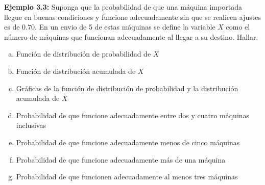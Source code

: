 \documentclass[base=hide,12pt]{elegantbook}
\begin{document}
\vspace{.5cm}
\textcolor{col3}{\bf Ejemplo 3.3:}  Suponga que la probabilidad de que una máquina importada llegue en buenas condiciones y funcione adecuadamente sin que se realicen ajustes es de $0.70$. En un envio de 5 de estas máquinas se define la variable $X$ como el número de máquinas que funcionan adecuadamente al llegar a su destino. Hallar:\\
%	
\begin{enumerate}[(a)] 	
 	\item Función de distribución de probabilidad de $X$
	\item Función de distribución acumulada de $X$
	\item Gráficas de la función de distribución de probabilidad y la distribución acumulada de $X$
	\item Probabilidad de que funcione adecuadamente entre dos y cuatro máquinas inclusivas
	\item Probabilidad de que funcione adecuadamente menos de cinco máquinas
	\item Probabilidad de que funcione adecuadamente más de una máquina
	\item Probabilidad de que funcionen adecuadamente al menos tres máquinas
\end{enumerate}	
\end{document}
